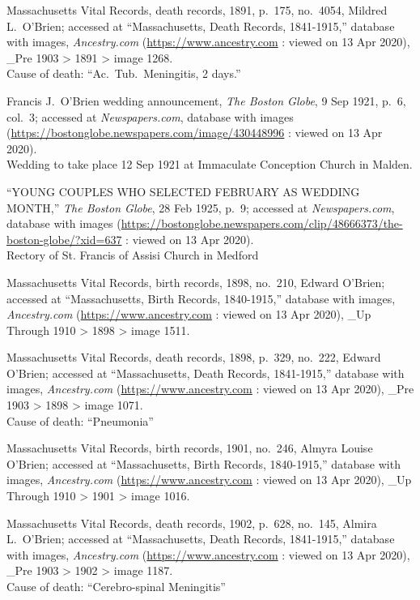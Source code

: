 \begin{thebibliography}{99}
	Massachusetts Vital Records, death records, 1891, p.\ 175, no.\ 4054, Mildred L.\ O'Brien; accessed at ``Massachusetts, Death Records, 1841-1915,'' database with images, \textit{Ancestry.com} (\url{https://www.ancestry.com} : viewed on 13 Apr 2020), \_Pre 1903 > 1891 > image 1268.\\
	Cause of death: ``Ac.\ Tub.\ Meningitis, 2 days.''
	
	Francis J.\ O'Brien wedding announcement, \textit{The Boston Globe}, 9 Sep 1921, p.\ 6, col.\ 3; accessed at \textit{Newspapers.com}, database with images (\url{https://bostonglobe.newspapers.com/image/430448996} : viewed on 13 Apr 2020).\\
	Wedding to take place 12 Sep 1921 at Immaculate Conception Church in Malden.
	
	``YOUNG COUPLES WHO SELECTED FEBRUARY AS WEDDING MONTH,'' \textit{The Boston Globe}, 28 Feb 1925, p.\ 9; accessed at \textit{Newspapers.com}, database with images (\url{https://bostonglobe.newspapers.com/clip/48666373/the-boston-globe/?xid=637} : viewed on 13 Apr 2020).\\
	Rectory of St. Francis of Assisi Church in Medford
	
	Massachusetts Vital Records, birth records, 1898, no.\ 210, Edward O'Brien; accessed at ``Massachusetts, Birth Records, 1840-1915,'' database with images, \textit{Ancestry.com} (\url{https://www.ancestry.com} : viewed on 13 Apr 2020), \_Up Through 1910 > 1898 > image 1511.
	
	Massachusetts Vital Records, death records, 1898, p.\ 329, no.\ 222, Edward O'Brien; accessed at ``Massachusetts, Death Records, 1841-1915,'' database with images, \textit{Ancestry.com} (\url{https://www.ancestry.com} : viewed on 13 Apr 2020), \_Pre 1903 > 1898 > image 1071.\\
	Cause of death: ``Pneumonia''
	
	Massachusetts Vital Records, birth records, 1901, no.\ 246, Almyra Louise O'Brien; accessed at ``Massachusetts, Birth Records, 1840-1915,'' database with images, \textit{Ancestry.com} (\url{https://www.ancestry.com} : viewed on 13 Apr 2020), \_Up Through 1910 > 1901 > image 1016.
	
	Massachusetts Vital Records, death records, 1902, p.\ 628, no.\ 145, Almira L.\ O'Brien; accessed at ``Massachusetts, Death Records, 1841-1915,'' database with images, \textit{Ancestry.com} (\url{https://www.ancestry.com} : viewed on 13 Apr 2020), \_Pre 1903 > 1902 > image 1187.\\
	Cause of death: ``Cerebro-spinal Meningitis''
	

\end{thebibliography}
